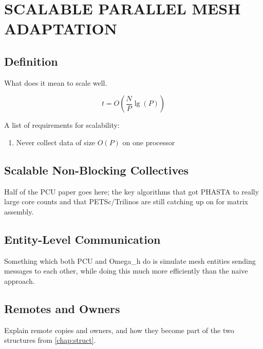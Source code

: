 
\chapter{SCALABLE PARALLEL MESH ADAPTATION}

\section{Definition}

What does it mean to scale well.

\begin{equation} \label{eq:big-o-scale}
t = O\left(\frac{N}{P}\lg(P)\right)
\end{equation}

A list of requirements for scalability:

\begin{enumerate}
\item Never collect data of size $O(P)$ on one processor
\end{enumerate}

\section{Scalable Non-Blocking Collectives}

Half of the PCU paper goes here; the key algorithms
that got PHASTA to really large core counts and
that PETSc/Trilinos are still catching up on for
matrix assembly.

\section{Entity-Level Communication}

Something which both PCU and Omega\_h do is simulate
mesh entities sending messages to each other, while
doing this much more efficiently than the naive approach.

\section{Remotes and Owners}

Explain remote copies and owners, and how they become
part of the two structures from \ref{chap:struct}.

